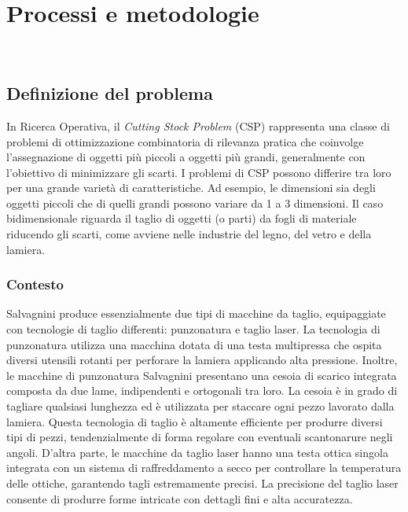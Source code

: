 \chapter{Processi e metodologie}
\label{cap:processi-metodologie}

\\

\section{Definizione del problema}

In Ricerca Operativa, il \emph{Cutting Stock Problem} (CSP) rappresenta una classe di problemi di ottimizzazione combinatoria di rilevanza pratica che coinvolge l'assegnazione di oggetti più piccoli a oggetti più grandi, generalmente con l'obiettivo di minimizzare gli scarti. I problemi di CSP possono differire tra loro per una grande varietà di caratteristiche. Ad esempio, le dimensioni sia degli oggetti piccoli che di quelli grandi possono variare da 1 a 3 dimensioni. Il caso bidimensionale riguarda il taglio di oggetti (o parti) da fogli di materiale riducendo gli scarti, come avviene nelle industrie del legno, del vetro e della lamiera.

\subsection{Contesto}

Salvagnini produce essenzialmente due tipi di macchine da taglio, equipaggiate con tecnologie di taglio differenti: punzonatura e taglio laser. La tecnologia di punzonatura utilizza una macchina dotata di una testa multipressa che ospita diversi utensili rotanti per perforare la lamiera applicando alta pressione. Inoltre, le macchine di punzonatura Salvagnini presentano una cesoia di scarico integrata composta da due lame, indipendenti e ortogonali tra loro. La cesoia è in grado di tagliare qualsiasi lunghezza ed è utilizzata per staccare ogni pezzo lavorato dalla lamiera. Questa tecnologia di taglio è altamente efficiente per produrre diversi tipi di pezzi, tendenzialmente di forma regolare con eventuali scantonarure negli angoli. D'altra parte, le macchine da taglio laser hanno una testa ottica singola integrata con un sistema di raffreddamento a secco per controllare la temperatura delle ottiche, garantendo tagli estremamente precisi. La precisione del taglio laser consente di produrre forme intricate con dettagli fini e alta accuratezza.

